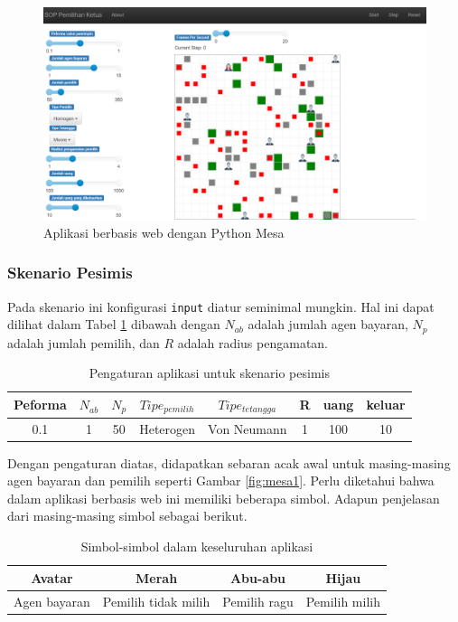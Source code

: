 \begin{figure}[H]
\centering
\includegraphics[width=\linewidth]{images/ch03/mesa0}
\caption{Aplikasi berbasis web dengan Python Mesa}
\label{fig:mesa0}
\end{figure}


\subsubsection{Skenario Pesimis}

Pada skenario ini konfigurasi \texttt{input} diatur seminimal mungkin. Hal ini dapat dilihat dalam Tabel \ref{tab:pengaturanpesimis} dibawah dengan $N_{ab}$ adalah jumlah agen bayaran, $N_{p}$ adalah jumlah pemilih, dan $R$ adalah radius pengamatan.

\begin{table}[H]
\centering
\caption{Pengaturan aplikasi untuk skenario pesimis}
	\begin{tabular}{cccccccc}
	\hline
	Peforma & $N_{ab}$ & $N_{p}$ & $Tipe_{pemilih}$ & $Tipe_{tetangga}$ & R & uang & keluar \\
	\hline
	0.1 & 1 & 50 & Heterogen & Von Neumann & 1 & 100 & 10\\
	\hline
	\end{tabular}
  \label{tab:pengaturanpesimis}
\end{table}

Dengan pengaturan diatas, didapatkan sebaran acak awal untuk masing-masing agen bayaran dan pemilih seperti Gambar \ref{fig:mesa1}. Perlu diketahui bahwa dalam aplikasi berbasis web ini memiliki beberapa simbol. Adapun penjelasan dari masing-masing simbol sebagai berikut.

\begin{table}[H]
\centering
\caption{Simbol-simbol dalam keseluruhan aplikasi}
	\begin{tabular}{cccc}
	\hline
	Avatar & Merah & Abu-abu & Hijau \\
	\hline
	Agen bayaran & Pemilih tidak milih & Pemilih ragu & Pemilih milih \\
	\hline
	\end{tabular}
  \label{tab:simbolaplikasi}
\end{table}

